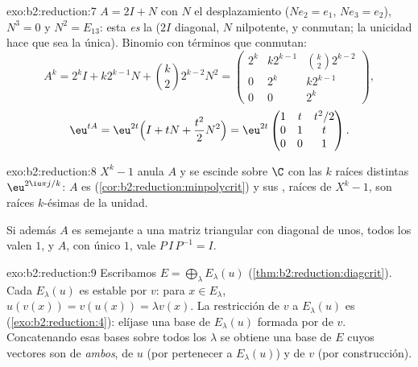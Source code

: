 \begin{solution}{exo:b2:reduction:7}
$A = 2I + N$ con $N$ el desplazamiento ($N e_2 = e_1$, $Ne_3 = e_2$),
$N^3 = 0$ y $N^2 = E_{13}$: esta \emph{es} la  ($2I$ diagonal, $N$ nilpotente, y conmutan; la unicidad hace
que sea la única). Binomio con términos que conmutan:
\[
A^k = 2^k I + k 2^{k-1} N + \binom k2 2^{k-2} N^2
= \begin{pmatrix}
2^k & k2^{k-1} & \binom k2 2^{k-2}\\
0 & 2^k & k2^{k-1}\\
0 & 0 & 2^k
\end{pmatrix},
\]
\[
\eu^{tA} = \eu^{2t}\Bigl(I + tN + \frac{t^2}{2}N^2\Bigr)
= \eu^{2t}\begin{pmatrix}
1 & t & t^2/2\\
0 & 1 & t\\
0 & 0 & 1
\end{pmatrix}.
\]
\end{solution}

\begin{solution}{exo:b2:reduction:8}
$X^k - 1$ anula $A$ y se escinde sobre $\C$ con las $k$ raíces
distintas $\eu^{2\iu\pi j/k}$: $A$ es 
(\cref{cor:b2:reduction:minpolycrit}) y sus , raíces
de $X^k - 1$, son raíces $k$-ésimas de la unidad.

Si además $A$ es semejante a una matriz triangular con diagonal de
unos, todos los  valen $1$, y $A$,  con
único  $1$, vale $P\,I\,P^{-1} = I$.
\end{solution}

\begin{solution}{exo:b2:reduction:9}
Escribamos $E = \bigoplus_\lambda E_\lambda(u)$
(\cref{thm:b2:reduction:diagcrit}). Cada $E_\lambda(u)$ es estable
por $v$: para $x \in E_\lambda$, $u(v(x)) = v(u(x)) = \lambda v(x)$.
La restricción de $v$ a $E_\lambda(u)$ es 
(\cref{exo:b2:reduction:4}): elíjase una base de $E_\lambda(u)$
formada por  de $v$. Concatenando esas bases sobre
todos los $\lambda$ se obtiene una base de $E$ cuyos vectores son
 de \emph{ambos}, de $u$ (por pertenecer a
$E_\lambda(u)$) y de $v$ (por construcción).
\end{solution}

